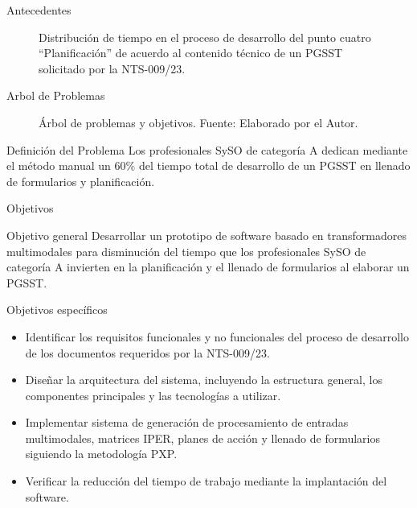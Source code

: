 \documentclass[spanish]{beamer} %
\begin{document}
\begin{frame}[allowframebreaks]{Antecedentes}
    \begin{figure}[b]
      \centering
        \resizebox{\textwidth}{!}{
            {\setlength{\fboxsep}{14pt} %
            \fbox{}}}
      \caption{Distribución de tiempo en el proceso de desarrollo del punto cuatro ``Planificación'' de acuerdo al contenido técnico de un PGSST solicitado por la NTS-009/23.}
      \label{fig:analisis_iper} 
    \end{figure}

\end{frame}

\begin{frame}{Arbol de Problemas}
  \begin{figure}[hb]
    \centering
    \resizebox{\textwidth}{!}{
      }
    \caption{Árbol de problemas y objetivos. Fuente: Elaborado por el Autor.}
    \label{fig:arbol_problemas} 
  \end{figure}
\end{frame}

\begin{frame}{Definición del Problema}
  Los profesionales SySO de categoría A dedican mediante el método manual un 60\% del tiempo total de desarrollo de un PGSST en llenado de formularios y planificación.
\end{frame}

\begin{frame}[allowframebreaks]{Objetivos}
  \begin{block}{Objetivo general}
    Desarrollar un prototipo de software basado en transformadores multimodales para disminución del tiempo que los profesionales SySO de categoría A invierten en la planificación y el llenado de formularios al elaborar un PGSST.
  \end{block}
  \begin{block}{Objetivos específicos}
  \begin{itemize}
    \small
    \item Identificar los requisitos funcionales y no funcionales del proceso de desarrollo de los documentos requeridos por la NTS-009/23.
    \item Diseñar la arquitectura del sistema, incluyendo la estructura general, los componentes principales y las tecnologías a utilizar.
    \item Implementar sistema de generación de procesamiento de entradas multimodales, matrices IPER, planes de acción y llenado de formularios siguiendo la metodología PXP.
    \item Verificar la reducción del tiempo de trabajo mediante la implantación del software.
  \end{itemize}
  \end{block}

\end{frame}
\end{document}

